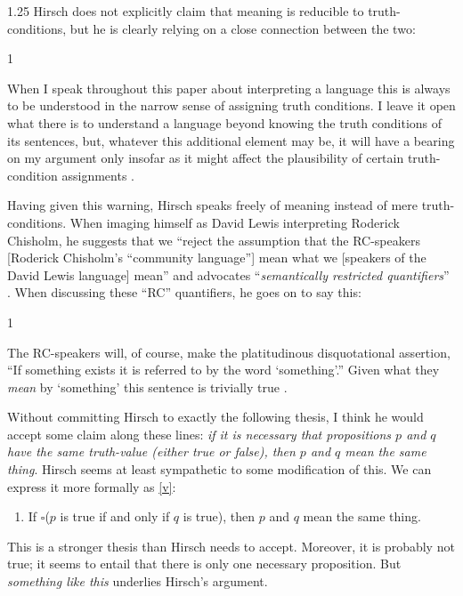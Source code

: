 \documentclass[11pt]{article}
\newenvironment{squote}{%
\begin{spacing}{1}
       	\begin{list}{}{%
\setlength{\labelwidth}{0pt}%
\rightmargin\leftmargin%
}
\item\relax
}{%
\end{list}%
\end{spacing}
}
\begin{document}
\begin{spacing}{1.25}
Hirsch does not explicitly claim that meaning is reducible to
truth-conditions, but he is clearly relying on a close connection
between the two:

\begin{squote}
When I speak throughout this paper about interpreting a language this
is always to be understood in the narrow sense of assigning truth
conditions.  I leave it open what there is to understand a language
beyond knowing the truth conditions of its sentences, but, whatever
this additional element may be, it will have a bearing on my argument
only insofar as it might affect the plausibility of certain
truth-condition assignments \citeyearpar[72]{hirsch2005}.
\end{squote}

Having given this warning, Hirsch speaks freely of meaning instead of
mere truth-conditions.  When imaging himself as David Lewis
interpreting Roderick Chisholm, he suggests that we ``reject the
assumption that the RC-speakers [Roderick Chisholm's ``community
  language''] mean what we [speakers of the David Lewis language]
mean'' \citeyearpar[76]{hirsch2005} and advocates ``{\em semantically
  restricted quantifiers}'' \citeyearpar[76, his
  emphasis]{hirsch2005}.  When discussing these ``RC'' quantifiers, he
goes on to say this:

\begin{squote}
The RC-speakers will, of course, make the platitudinous disquotational
assertion, ``If something exists it is referred to by the word
`something'.''  Given what they {\em mean} by `something' this
sentence is trivially true \citeyearpar[77, my emphasis]{hirsch2005}.
\end{squote}

Without committing Hirsch to exactly the following thesis, I think he
would accept some claim along these lines: {\em if it is necessary
  that propositions $p$ and $q$ have the same truth-value (either true
  or false), then $p$ and $q$ mean the same thing}.  Hirsch seems at
least sympathetic to some modification of this.  We can express it
more formally as \ref{v}:
\begin{enumerate}[itemindent=25pt, label=(M)]
    \item If $\square$($p$ is true if and only if $q$ is true), then
      $p$ and $q$ mean the same thing. \label{v}
\end{enumerate}

This is a stronger thesis than Hirsch needs to accept.  Moreover, it
is probably not true; it seems to entail that there is only one
necessary proposition.  But {\em something like this} underlies
Hirsch's argument.


\end{spacing}
\end{document}
